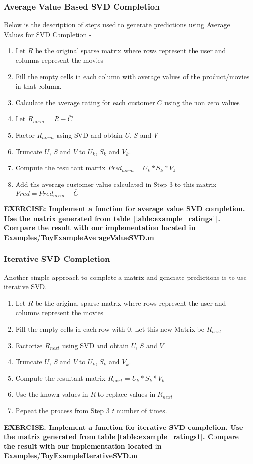 \documentclass{article}
\begin{document}
  \subsubsection{Average Value Based SVD Completion}
  Below is the description of steps used to generate predictions using Average Values for SVD Completion -
  \begin{enumerate}
    \item Let $R$ be the original sparse matrix where rows represent the user and columns represent the movies
    \item Fill the empty cells in each column with average values of the product/movies in that column.
    \item Calculate the average rating for each customer $\overline{C}$ using the non zero values
    \item Let $R_{norm} = R - \overline{C}$  
    \item Factor $R_{norm}$ using SVD and obtain $U$, $S$ and $V$
    \item Truncate $U$, $S$ and $V$ to $U_k$, $S_k$ and $V_k$.
    \item Compute the resultant matrix $Pred_{norm} = U_k*S_k*V_k$
    \item Add the average customer value calculated in Step 3 to this matrix $Pred = Pred_{norm} + \overline{C} $
  \end{enumerate}
  {\color{blue}\textbf{EXERCISE: Implement a function for average value SVD completion. Use the matrix generated from table \ref{table:example_ratings1}. Compare the result with our implementation located in Examples/ToyExampleAverageValueSVD.m}}
  \subsubsection{Iterative SVD Completion}
  Another simple approach to complete a matrix and generate predictions is to use iterative SVD. 
  \begin{enumerate}
    \item Let $R$ be the original sparse matrix where rows represent the user and columns represent the movies
    \item Fill the empty cells in each row with 0. Let this new Matrix be $R_{next}$
    \item Factorize $R_{next}$ using SVD and obtain $U$, $S$ and $V$
    \item Truncate $U$, $S$ and $V$ to $U_k$, $S_k$ and $V_k$.
    \item Compute the resultant matrix $R_{next} = U_k*S_k*V_k$
    \item Use the known values in $R$ to replace values in $R_{next}$
    \item Repeat the process from Step 3 $t$ number of times.
  \end{enumerate}
  {\color{blue}\textbf{EXERCISE: Implement a function for iterative SVD completion. Use the matrix generated from table \ref{table:example_ratings1}. Compare the result with our implementation located in Examples/ToyExampleIterativeSVD.m}}
\end{document}
